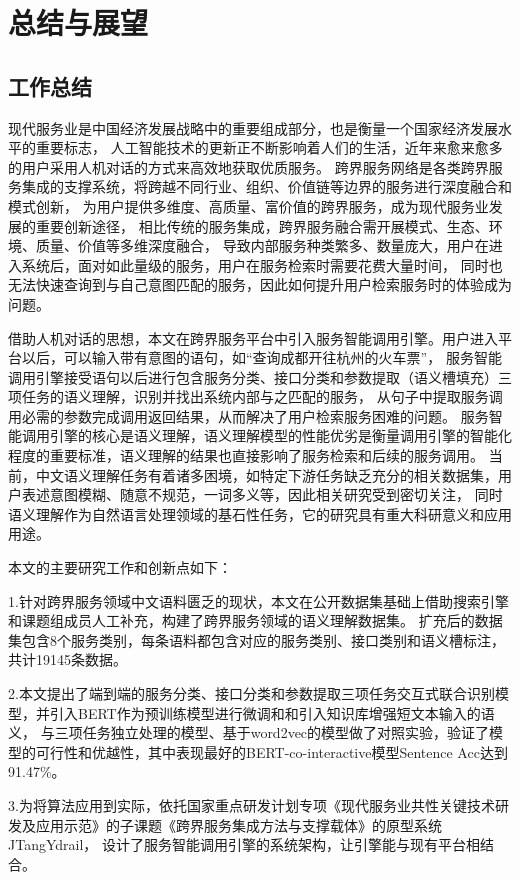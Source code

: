 \chapter{总结与展望}
\section{工作总结}
现代服务业是中国经济发展战略中的重要组成部分，也是衡量一个国家经济发展水平的重要标志，
人工智能技术的更新正不断影响着人们的生活，近年来愈来愈多的用户采用人机对话的方式来高效地获取优质服务。
跨界服务网络是各类跨界服务集成的支撑系统，将跨越不同行业、组织、价值链等边界的服务进行深度融合和模式创新，
为用户提供多维度、高质量、富价值的跨界服务，成为现代服务业发展的重要创新途径，
相比传统的服务集成，跨界服务融合需开展模式、生态、环境、质量、价值等多维深度融合，
导致内部服务种类繁多、数量庞大，用户在进入系统后，面对如此量级的服务，用户在服务检索时需要花费大量时间，
同时也无法快速查询到与自己意图匹配的服务，因此如何提升用户检索服务时的体验成为问题。

借助人机对话的思想，本文在跨界服务平台中引入服务智能调用引擎。用户进入平台以后，可以输入带有意图的语句，如“查询成都开往杭州的火车票”，
服务智能调用引擎接受语句以后进行包含服务分类、接口分类和参数提取（语义槽填充）三项任务的语义理解，识别并找出系统内部与之匹配的服务，
从句子中提取服务调用必需的参数完成调用返回结果，从而解决了用户检索服务困难的问题。
服务智能调用引擎的核心是语义理解，语义理解模型的性能优劣是衡量调用引擎的智能化程度的重要标准，语义理解的结果也直接影响了服务检索和后续的服务调用。
当前，中文语义理解任务有着诸多困境，如特定下游任务缺乏充分的相关数据集，用户表述意图模糊、随意不规范，一词多义等，因此相关研究受到密切关注，
同时语义理解作为自然语言处理领域的基石性任务，它的研究具有重大科研意义和应用用途。

本文的主要研究工作和创新点如下：

1.针对跨界服务领域中文语料匮乏的现状，本文在公开数据集基础上借助搜索引擎和课题组成员人工补充，构建了跨界服务领域的语义理解数据集。
扩充后的数据集包含8个服务类别，每条语料都包含对应的服务类别、接口类别和语义槽标注，共计19145条数据。

2.本文提出了端到端的服务分类、接口分类和参数提取三项任务交互式联合识别模型，并引入BERT作为预训练模型进行微调和和引入知识库增强短文本输入的语义，
与三项任务独立处理的模型、基于word2vec的模型做了对照实验，验证了模型的可行性和优越性，其中表现最好的BERT-co-interactive模型Sentence Acc达到91.47\%。

3.为将算法应用到实际，依托国家重点研发计划专项《现代服务业共性关键技术研发及应用示范》的子课题《跨界服务集成方法与支撑载体》的原型系统JTangYdrail，
设计了服务智能调用引擎的系统架构，让引擎能与现有平台相结合。

